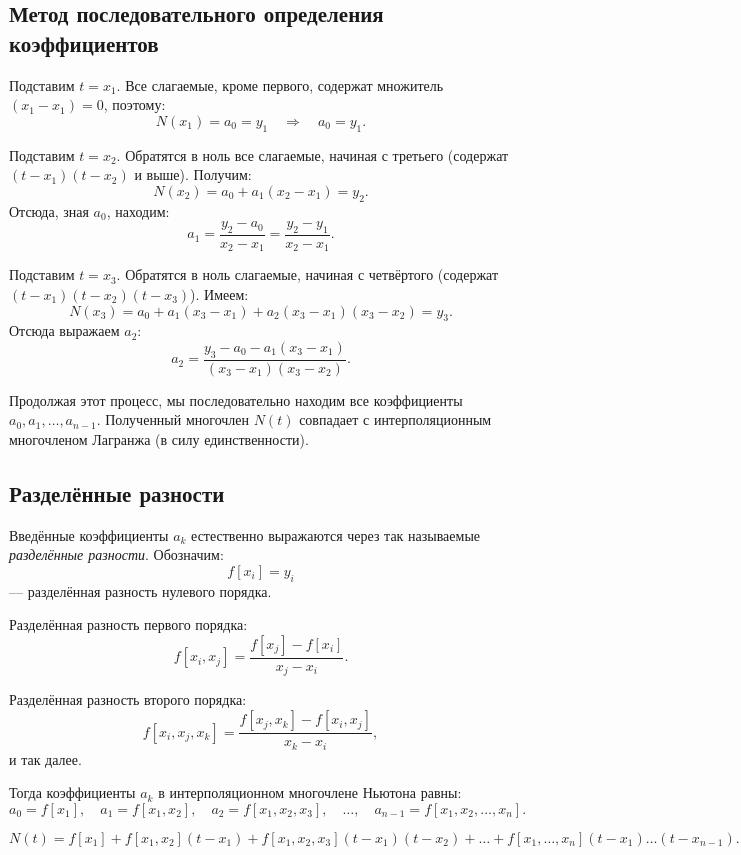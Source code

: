 \documentclass[a4paper,12pt]{article}
\theoremstyle{definition}
\theoremstyle{plain}
\theoremstyle{remark}
\begin{document}
	\subsection{Метод последовательного определения коэффициентов}
	
	Подставим \( t = x_1 \). Все слагаемые, кроме первого, содержат множитель \( (x_1 - x_1) = 0 \), поэтому:
	\[
	N(x_1) = a_0 = y_1 \quad \Rightarrow \quad a_0 = y_1.
	\]
	
	Подставим \( t = x_2 \). Обратятся в ноль все слагаемые, начиная с третьего (содержат \( (t - x_1)(t - x_2) \) и выше). Получим:
	\[
	N(x_2) = a_0 + a_1(x_2 - x_1) = y_2.
	\]
	Отсюда, зная \( a_0 \), находим:
	\[
	a_1 = \frac{y_2 - a_0}{x_2 - x_1} = \frac{y_2 - y_1}{x_2 - x_1}.
	\]
	
	Подставим \( t = x_3 \). Обратятся в ноль слагаемые, начиная с четвёртого (содержат \( (t - x_1)(t - x_2)(t - x_3) \)). Имеем:
	\[
	N(x_3) = a_0 + a_1(x_3 - x_1) + a_2(x_3 - x_1)(x_3 - x_2) = y_3.
	\]
	Отсюда выражаем \( a_2 \):
	\[
	a_2 = \frac{y_3 - a_0 - a_1(x_3 - x_1)}{(x_3 - x_1)(x_3 - x_2)}.
	\]
	
	Продолжая этот процесс, мы последовательно находим все коэффициенты \( a_0, a_1, \dots, a_{n-1} \). Полученный многочлен \( N(t) \) совпадает с интерполяционным многочленом Лагранжа (в силу единственности).
	
	\subsection{Разделённые разности}
	
	Введённые коэффициенты \( a_k \) естественно выражаются через так называемые \textit{разделённые разности}. Обозначим:
	\[
	f[x_i] = y_i
	\]
	— разделённая разность нулевого порядка.
	
	Разделённая разность первого порядка:
	\[
	f[x_i, x_j] = \frac{f[x_j] - f[x_i]}{x_j - x_i}.
	\]
	
	Разделённая разность второго порядка:
	\[
	f[x_i, x_j, x_k] = \frac{f[x_j, x_k] - f[x_i, x_j]}{x_k - x_i},
	\]
	и так далее.
	
	Тогда коэффициенты \( a_k \) в интерполяционном многочлене Ньютона равны:
	\[
	a_0 = f[x_1], \quad a_1 = f[x_1, x_2], \quad a_2 = f[x_1, x_2, x_3], \quad \dots, \quad a_{n-1} = f[x_1, x_2, \dots, x_n].
	\]
	
	\begin{tcolorbox}[colback=green!5, colframe=green!50!black, title=Формула Ньютона через разделённые разности]
		\[
		N(t) = f[x_1] + f[x_1, x_2](t - x_1) + f[x_1, x_2, x_3](t - x_1)(t - x_2) + \dots + f[x_1, \dots, x_n](t - x_1)\dots(t - x_{n-1}).
		\]
	\end{tcolorbox}
	
\end{document}
